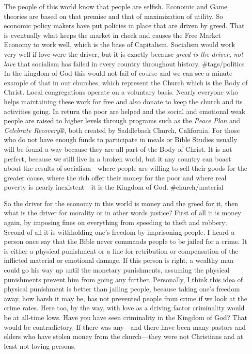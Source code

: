 The people of this world know that people are selfish. Economic and Game
theories are based on that premise and that of maximization of utility.
So economic policy makers have put policies in place that are driven by
greed. That is eventually what keeps the market in check and causes the
Free Market Economy to work well, which is the base of Capitalism.
Socialism would work very well if love were the driver, but it is
exactly because \emph{greed is the driver, not love} that socialism has
failed in every country throughout history. \#tags/politics In the
kingdom of God this would not fail of course and we can see a minute
example of that in our churches, which represent the Church which is the
Body of Christ. Local congregations operate on a voluntary basis. Nearly
everyone who helps maintaining these work for free and also donate to
keep the church and its activities going. In return the poor are helped
and the social and emotional weak people are raised to higher levels
through programs such as the \emph{Peace Plan} and \emph{Celebrate
Recovery®}, both created by Saddleback Church, California. For those who
do not have enough funds to participate in meals or Bible Studies
usually will be found a way because they are all part of the Body of
Christ. It is not perfect, because we still live in a broken world, but
it any country can boast about the results of socialism---where people
are willing to sell their goods for the greater cause, where the rich
offer their money for the poor and where real poverty is nearly
inexistent---it is the Kingdom of God. \#church/material

So the driver for the economy in this world is money and the greed for
it, then what is the driver for morality or in other words justice?
First of all it is money again, by imposing fines on everything from
speeding to theft and robbery; Second of all it is withholding one's
freedom by imprisoning people. I heard a person once say that the Bible
never commands people to be jailed for a crime. It is either a physical
punishment or a fine for retribution or compensation of the inflicted
material or emotional damage. If this person is right, a wealthy man
could go his way up until the monetary punishments, assuming the
physical punishments prevent him from going any further. Personally, I
think this idea of physical punishment is better than jailing people,
because taking one's freedom away, how harsh it may be, has not
prevented people from crime if we look at the crime rates. Here too, by
the way, with love as a driving factor criminality would be at all-time
lows. Have you have seen criminality in the Kingdom of God? That would
be contradictory. If there was any---and there have been many pastors
and elders who have stolen money from the church---they were not
Christians and at least not loving persons.

